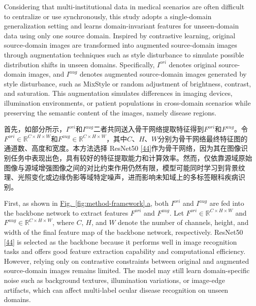 Considering that multi-institutional data in medical scenarios are often difficult to centralize or use synchronously, this study adopts a single-domain generalization setting and learns domain-invariant features for unseen-domain data using only one source domain. Inspired by contrastive learning, original source-domain images are transformed into augmented source-domain images through augmentation techniques such as style disturbance to simulate possible distribution shifts in unseen domains. Specifically, \(I^{ori}\) denotes original source-domain images, and \(I^{aug}\) denotes augmented source-domain images generated by style disturbance, such as MixStyle or random adjustment of brightness, contrast, and saturation. This augmentation simulates differences in imaging devices, illumination environments, or patient populations in cross-domain scenarios while preserving the semantic content of the images, namely disease regions.

首先，如部分所示，\(I^{ori}\)和\(I^{aug}\)二者共同送入骨干网络提取特征得到\(F^{ori}\)和\(F^{aug}\)。令\(F^{ori} \in \mathbb{R}^{C \times H \times W}\)和\(F^{aug} \in \mathbb{R}^{C \times H \times W}\)，其中\(C\)、\(H\)、\(W\)分别为骨干网络最终特征图的通道数、高度和宽度。本方法选择 ResNet50 \hyperref[_RefResNet2016]{{[}44{]}}作为骨干网络，因为其在图像识别任务中表现出色，具有较好的特征提取能力和计算效率。然而，仅依靠源域原始图像与源域增强图像之间的对比约束作用仍然有限，模型可能同时学习到背景纹理、光照变化或边缘伪影等域特定噪声，进而影响未知域上的多标签眼科疾病识别。

First, as shown in \hyperref[fig:method-framework]{Fig.~\ref*{fig:method-framework}.a}, both \(I^{ori}\) and \(I^{aug}\) are fed into the backbone network to extract features \(F^{ori}\) and \(F^{aug}\). Let \(F^{ori} \in \mathbb{R}^{C \times H \times W}\) and \(F^{aug} \in \mathbb{R}^{C \times H \times W}\), where \(C\), \(H\), and \(W\) denote the number of channels, height, and width of the final feature map of the backbone network, respectively. ResNet50 \hyperref[_RefResNet2016]{{[}44{]}} is selected as the backbone because it performs well in image recognition tasks and offers good feature extraction capability and computational efficiency. However, relying only on contrastive constraints between original and augmented source-domain images remains limited. The model may still learn domain-specific noise such as background textures, illumination variations, or image-edge artifacts, which can affect multi-label ocular disease recognition on unseen domains.

